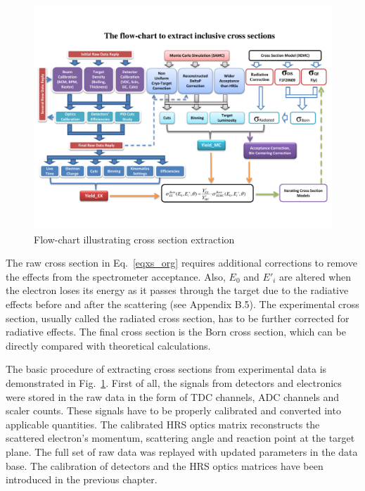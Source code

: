 \begin{figure}[!ht]
 \begin{center}
  \includegraphics[angle=90, type=pdf, ext=.pdf,read=.pdf,width=1.\textwidth]{./figures/E08014_XS_FlowChart}
  \caption[Flow-chart illustrating cross section extraction]{Flow-chart illustrating cross section extraction}
  \label{xs_flow_chart}
 \end{center}
\end{figure}
The raw cross section in Eq.~\eqref{eqxs_org} requires additional corrections to remove the effects from the spectrometer acceptance. Also, $E_{0}$ and $E'_{i}$ are altered when the electron loses its energy as it passes through the target due to the radiative effects before and after the scattering (see Appendix B.5). The experimental cross section, usually called the radiated cross section, has to be further corrected for radiative effects. The final cross section is the Born cross section, which can be directly compared with theoretical calculations. 

 The basic procedure of extracting cross sections from experimental data is demonstrated in Fig.~\ref{xs_flow_chart}. First of all, the signals from detectors and electronics were stored in the raw data in the form of TDC channels, ADC channels and scaler counts. These signals have to be properly calibrated and converted into applicable quantities. The calibrated HRS optics matrix reconstructs the scattered electron's momentum, scattering angle and reaction point at the target plane. The full set of raw data was replayed with updated parameters in the data base. The calibration of detectors and the HRS optics matrices have been introduced in the previous chapter. 
 
